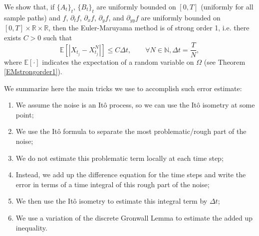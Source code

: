 \documentclass[reqno,12pt]{amsart}
\theoremstyle{plain}%
\theoremstyle{definition}
\begin{document}
We show that, if $\{A_t\}_t$, $\{B_t\}_t$ are uniformly bounded on $[0, T]$ (uniformly for all sample paths) and $f$, $\partial_t f$, $\partial_x f$, $\partial_y f$, and $\partial_{yy}f$ are uniformly bounded on $[0, T]\times \mathbb{R}\times \mathbb{R}$, then the Euler-Maruyama method is of strong order 1, i.e. there exists $C>0$ such that
\begin{equation}
  \mathbb{E}\left[ \left| X_{t_j} - X_{t_j}^N \right| \right] \leq C \Delta t, \qquad \forall N \in \mathbb{N},  \Delta t = \frac{T}{N},
\end{equation}
where $\mathbb{E}[\cdot]$ indicates the expectation of a random variable on $\Omega$ (see Theorem \ref{EMstrongorder1}).

We summarize here the main tricks we use to accomplish such error estimate:
\begin{enumerate}
  \item We assume the noise is an It\^o process, so we can use the It\^o isometry at some point;
  \item We use the It\^o formula to separate the most problematic/rough part of the noise;
  \item We do not estimate this problematic term locally at each time step;
  \item Instead, we add up the difference equation for the time steps and write the error in terms of a time integral of this rough part of the noise;
  \item We then use the It\^o isometry to estimate this integral term by $\Delta t$;
  \item We use a variation of the discrete Gronwall Lemma to estimate the added up inequality.
\end{enumerate}
\end{document}
